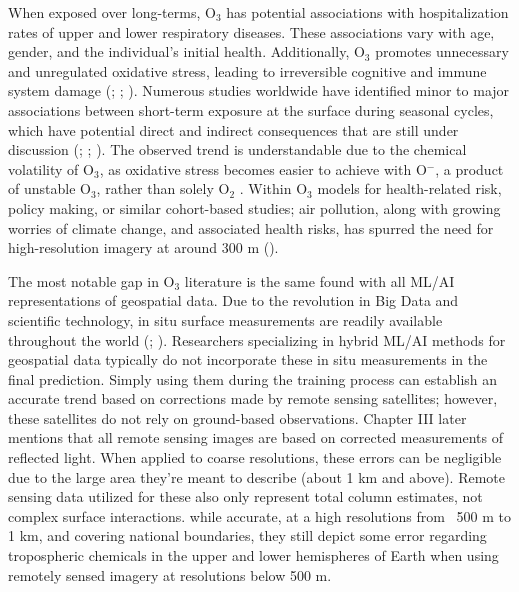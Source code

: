 When exposed over long-terms, O$_3$ has potential associations with hospitalization rates of upper and lower respiratory diseases. These associations vary with age, gender, and the individual's initial health. Additionally, O$_3$ promotes unnecessary and unregulated oxidative stress, leading to irreversible cognitive and immune system damage (\cite{barzeghar_long-term_2020}; \cite{fania_machine_2024}; \cite{luan_assessment_2024}). Numerous studies worldwide have identified minor to major associations between short-term exposure at the surface during seasonal cycles, which have potential direct and indirect consequences that are still under discussion (\cite{marx_short_2020}; \cite{ma_short-term_2023}; \cite{zhang_short-term_2023}). The observed trend is understandable due to the chemical volatility of O$_3$, as oxidative stress becomes easier to achieve with O$^{-}$, a product of unstable O$_3$, rather than solely O$_2$ \cite{cai_oxidative_2022}. Within O$_3$ models for health-related risk, policy making, or similar cohort-based studies; air pollution, along with growing worries of climate change, and associated health risks, has spurred the need for high-resolution imagery at around 300 m (\cite{wang_does_2023}). 

The most notable gap in O$_3$ literature is the same found with all ML/AI representations of geospatial data. Due to the revolution in Big Data and scientific technology, in situ surface measurements are readily available throughout the world (\cite{gaudel_tropospheric_2018}; \cite{schultz_tropospheric_2017}). Researchers specializing in hybrid ML/AI methods for geospatial data typically do not incorporate these in situ measurements in the final prediction. Simply using them during the training process can establish an accurate trend based on corrections made by remote sensing satellites; however, these satellites do not rely on ground-based observations. Chapter III later mentions that all remote sensing images are based on corrected measurements of reflected light. When applied to coarse resolutions, these errors can be negligible due to the large area they’re meant to describe (about 1 km and above). Remote sensing data utilized for these also only represent total column estimates, not complex surface interactions. while accurate, at a high resolutions from ~500 m to 1 km, and covering national boundaries, they still depict some error regarding tropospheric chemicals in the upper and lower hemispheres of Earth when using remotely sensed imagery at resolutions below 500 m.
